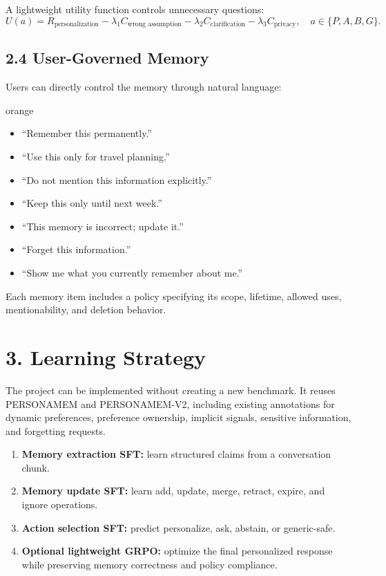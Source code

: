 \documentclass[10pt,a4paper]{article}
\begin{document}
A lightweight utility function controls unnecessary questions:
\[
U(a)=R_{\text{personalization}}-\lambda_1C_{\text{wrong assumption}}-\lambda_2C_{\text{clarification}}-\lambda_3C_{\text{privacy}},
\quad a\in\{P,A,B,G\}.
\]

\subsection{2.4 User-Governed Memory}

Users can directly control the memory through natural language:

\begin{compactbox}{orange}
\begin{itemize}
  \item ``Remember this permanently.''
  \item ``Use this only for travel planning.''
  \item ``Do not mention this information explicitly.''
  \item ``Keep this only until next week.''
  \item ``This memory is incorrect; update it.''
  \item ``Forget this information.''
  \item ``Show me what you currently remember about me.''
\end{itemize}
\end{compactbox}

Each memory item includes a policy specifying its scope, lifetime, allowed uses, mentionability, and deletion behavior.

\section{3. Learning Strategy}

The project can be implemented without creating a new benchmark. It reuses PERSONAMEM and PERSONAMEM-V2, including existing annotations for dynamic preferences, preference ownership, implicit signals, sensitive information, and forgetting requests.

\begin{enumerate}
  \item \textbf{Memory extraction SFT:} learn structured claims from a conversation chunk.
  \item \textbf{Memory update SFT:} learn add, update, merge, retract, expire, and ignore operations.
  \item \textbf{Action selection SFT:} predict personalize, ask, abstain, or generic-safe.
  \item \textbf{Optional lightweight GRPO:} optimize the final personalized response while preserving memory correctness and policy compliance.
\end{enumerate}
\end{document}
